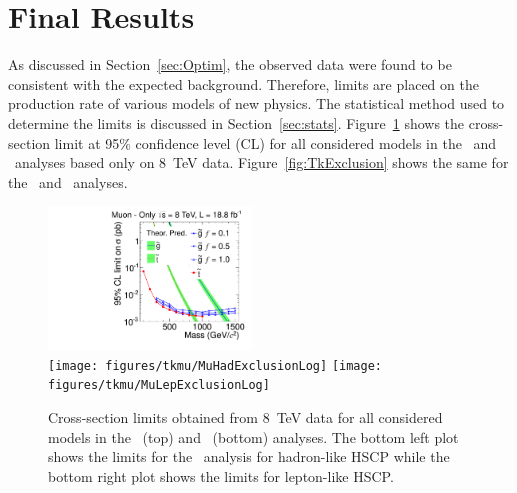 \section{Final Results}
As discussed in Section~\ref{sec:Optim}, the observed data were found to be consistent with the expected background.
Therefore, limits are placed on the production rate of various models of new physics. The statistical method used to determine the limits is discussed in
Section~\ref{sec:stats}. Figure~\ref{fig:MuExclusion}
shows the cross-section limit at 95\% confidence level (CL) for all considered models in the \muononly\ and \tktof\ analyses based only on 8~TeV data.
Figure~\ref{fig:TkExclusion} shows the same for the \tkonly\ and \multi\ analyses.

\begin{figure}
\centering
  \includegraphics[clip=false, trim=0.0cm 0cm 0.0cm 0cm, width=0.48\textwidth]{figures/muonly/MOExclusionLog} \\
  \texttt{[image: figures/tkmu/MuHadExclusionLog]}
  \texttt{[image: figures/tkmu/MuLepExclusionLog]} \\
\caption[Cross-section limits obtained from 8~TeV data for all considered models in the \muononly\ and \tktof\ analyses]
{Cross-section limits obtained from 8~TeV data for all considered models in the \muononly\ (top) and \tktof\ (bottom) analyses.
The bottom left plot shows the limits for the \tktof\ analysis for hadron-like HSCP while the bottom right plot shows the limits for lepton-like HSCP.
}
    \label{fig:MuExclusion}
\end{figure}

